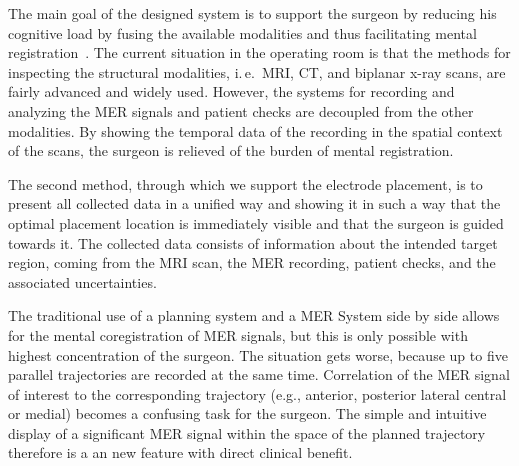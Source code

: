 \documentclass[review]{vgtc}                 %
\begin{document}

The main goal of the designed system is to support the surgeon by reducing his cognitive load by fusing the available modalities and thus facilitating mental registration~\cite{Tory1998}. The current situation in the operating room is that the methods for inspecting the structural modalities, i.\,e.~MRI, CT, and biplanar x-ray scans, are fairly advanced and widely used. However, the systems for recording and analyzing the MER signals and patient checks are decoupled from the other modalities. By showing the temporal data of the recording in the spatial context of the scans, the surgeon is relieved of the burden of mental registration.


The second method, through which we support the electrode placement, is to present all collected data in a unified way and showing it in such a way that the optimal placement location is immediately visible and that the surgeon is guided towards it. The collected data consists of information about the intended target region, coming from the MRI scan, the MER recording, patient checks, and the associated uncertainties.

The traditional use of a planning system and a MER System side by side allows for the mental coregistration of MER signals, but this is only possible with highest concentration of the surgeon. The situation gets worse, because up to five parallel trajectories are recorded at the same time. Correlation of the MER signal of interest to the corresponding trajectory (e.g., anterior, posterior lateral central or medial) becomes a confusing task for the surgeon. The simple and intuitive display of a significant MER signal within the space of the planned trajectory therefore is a an new feature with direct clinical benefit.   
\end{document}
